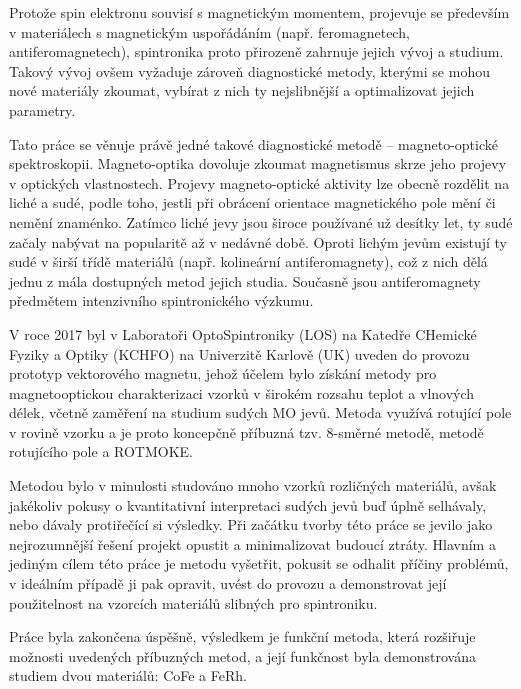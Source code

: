 Protože spin elektronu souvisí s magnetickým momentem, projevuje se především v materiálech s magnetickým uspořádáním (např. feromagnetech, antiferomagnetech), spintronika proto přirozeně zahrnuje jejich vývoj a studium.
Takový vývoj ovšem vyžaduje zároveň diagnostické metody, kterými se mohou nové materiály zkoumat, vybírat z nich ty nejslibnější a optimalizovat jejich parametry.

Tato práce se věnuje právě jedné takové diagnostické metodě -- magneto-optické spektroskopii.
Magneto-optika dovoluje zkoumat magnetismus skrze jeho projevy v optických vlastnostech.
Projevy magneto-optické aktivity lze obecně rozdělit na liché a sudé, podle toho, jestli při obrácení orientace magnetického pole mění či nemění znaménko.
Zatímco liché jevy jsou široce používané už desítky let, ty sudé začaly nabývat na popularitě až v nedávné době.
Oproti lichým jevům existují ty sudé v širší třídě materiálů (např. kolineární antiferomagnety), což z nich dělá jednu z mála dostupných metod jejich studia.
Současně jsou antiferomagnety předmětem intenzivního spintronického výzkumu.

V roce 2017 byl v Laboratoři OptoSpintroniky (LOS) na Katedře CHemické Fyziky a Optiky (KCHFO) na Univerzitě Karlově (UK) uveden do provozu prototyp vektorového magnetu, jehož účelem bylo získání metody pro magnetooptickou charakterizaci vzorků v širokém rozsahu teplot a vlnových délek, včetně zaměření na studium sudých MO jevů.
Metoda využívá rotující pole v rovině vzorku a je proto koncepčně příbuzná tzv. 8-směrné metodě, metodě rotujícího pole a ROTMOKE.

Metodou bylo v minulosti studováno mnoho vzorků rozličných materiálů, avšak jakékoliv pokusy o kvantitativní interpretaci sudých jevů buď úplně selhávaly, nebo dávaly protiřečící si výsledky.
Při začátku tvorby této práce se jevilo jako nejrozumnější řešení projekt opustit a minimalizovat budoucí ztráty.
Hlavním a jediným cílem této práce je metodu vyšetřit, pokusit se odhalit příčiny problémů, v ideálním případě ji pak opravit, uvést do provozu a demonstrovat její použitelnost na vzorcích materiálů slibných pro spintroniku.

Práce byla zakončena úspěšně, výsledkem je funkční metoda, která rozšiřuje možnosti uvedených příbuzných metod, a její funkčnost byla demonstrována studiem dvou materiálů: CoFe a FeRh.
